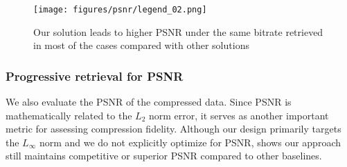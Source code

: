 \begin{figure}[ht] \centering
\texttt{[image: figures/psnr/legend\_02.png]}

\hspace{-4mm}
\vspace{-3mm}

\hspace{-4mm}

\vspace{-2mm}
\caption{Our solution leads to higher PSNR under the same bitrate retrieved in most of the cases compared with other solutions}
\label{fig:psnr}
\vspace{-4mm}
\end{figure}

\subsubsection{Progressive retrieval for PSNR}
We also evaluate the PSNR of the compressed data. Since PSNR is mathematically related to the $L_2$ norm error, it serves as another important metric for assessing compression fidelity.
Although our design primarily targets the $L_\infty$ norm and we do not explicitly optimize for PSNR,  shows our approach still maintains competitive or superior PSNR compared to other baselines.

